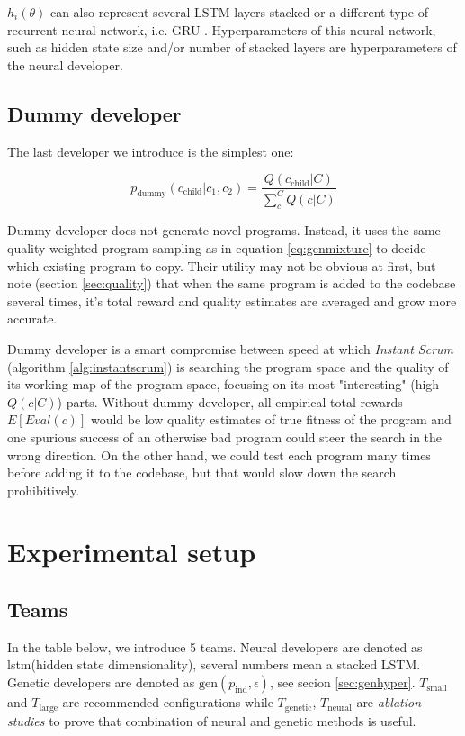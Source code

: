 $h_i(\theta)$ can also represent several LSTM layers stacked or a different type of recurrent neural network, i.e. GRU \cite{gru}.
Hyperparameters of this neural network, such as hidden state size and/or number of stacked layers are hyperparameters of the neural developer.  

\subsection{Dummy developer}

The last developer we introduce is the simplest one:

\begin{equation}
    p_\text{dummy}(c_\text{child}|c_1,c_2) = 
    \frac{Q(c_\text{child}|C)}{\sum\limits_{c}^{C} Q(c|C)} 
    \label{eq:dummy}
\end{equation}

Dummy developer does not generate novel programs.
Instead, it uses the same quality-weighted program sampling as in equation \ref{eq:genmixture} to decide which existing program to copy.
Their utility may not be obvious at first, but note (section \ref{sec:quality}) that when the same program is added to the codebase several times, it's total reward and quality estimates are averaged and grow more accurate.

Dummy developer is a smart compromise between speed at which \emph{Instant Scrum} (algorithm \ref{alg:instantscrum}) is searching the program space and the quality of its working map of the program space, focusing on its most "interesting" (high $Q(c|C)$) parts. 
Without dummy developer, all empirical total rewards $E[Eval(c)]$ would be low quality estimates of true fitness of the program and one spurious success of an otherwise bad program could steer the search in the wrong direction.
On the other hand, we could test each program many times before adding it to the codebase, but that would slow down the search prohibitively. 

\section{Experimental setup}
\label{sec:experiments}

\subsection{Teams}

In the table below, we introduce 5 teams.
Neural developers are denoted as lstm(hidden state dimensionality), several numbers mean a stacked LSTM.
Genetic developers are denoted as $\text{gen}(p_\text{ind},\epsilon)$, see secion \ref{sec:genhyper}.
$T_\text{small}$ and $T_\text{large}$ are recommended configurations while $T_\text{genetic}$, $T_\text{neural}$ are \emph{ablation studies} to prove that combination of neural and genetic methods is useful.

